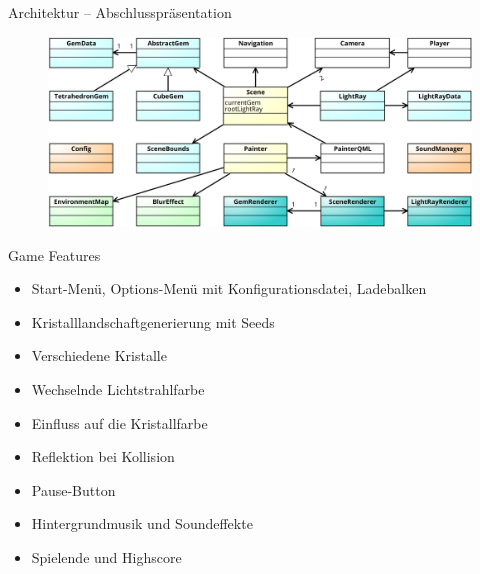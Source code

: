 \begin{frame}{Architektur -- Abschlusspräsentation}
	\begin{figure}
		\centering
		\includegraphics[width=\textwidth, height=0.7\textheight, keepaspectratio]{images/klassendiagramm-final}
	\end{figure}
\end{frame}

\begin{frame}{Game Features}
	\begin{itemize}
		\item Start-Menü, Options-Menü mit Konfigurationsdatei, Ladebalken
		\item Kristalllandschaftgenerierung mit Seeds
		\item Verschiedene Kristalle
		\item Wechselnde Lichtstrahlfarbe
		\item Einfluss auf die Kristallfarbe
		\item Reflektion bei Kollision
		\item Pause-Button
		\item Hintergrundmusik und Soundeffekte
		\item Spielende und Highscore
	\end{itemize}
\end{frame}

